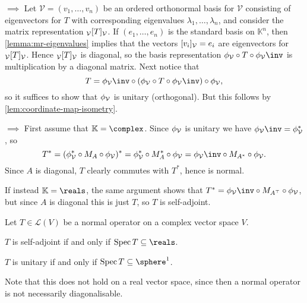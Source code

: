 \documentclass[a4paper, 11pt]{memoir}
\numberwithin{equation}{chapter}
\newcommand{\calL}{\mathcal{L}}
\newcommand{\calV}{\mathcal{V}}
\DeclareMathOperator{\spec}{Spec}
\newcommand{\trans}{^{\top}}
\begin{document}
\begin{proofof}
\begin{proofsec*}
    \item[\Namesubcref{enum:spectral-orthogonally-diagonalisable} $\implies$ \namesubcref{enum:spectral-multiplication-operator}]
    Let $\calV = (v_1, \ldots, v_n)$ be an ordered orthonormal basis for $\calV$ consisting of eigenvectors for $T$ with corresponding eigenvalues $\lambda_1, \ldots, \lambda_n$, and consider the matrix representation $\mr{\calV}{T}{\calV}$. If $(e_1, \ldots, e_n)$ is the standard basis on $\mathbb{K}^n$, then \cref{lemma:mr-eigenvalues} implies that the vectors $\coordvec{v_i}{\calV} = e_i$ are eigenvectors for $\mr{\calV}{T}{\calV}$. Hence $\mr{\calV}{T}{\calV}$ is diagonal, so the basis representation $\coordmap{\calV} \circ T \circ \coordmap{\calV}\inv$ is multiplication by a diagonal matrix. Next notice that
    \begin{equation*}
        T
            = \coordmap{\calV}\inv \circ (\coordmap{\calV} \circ T \circ \coordmap{\calV}\inv) \circ \coordmap{\calV},
    \end{equation*}
    so it suffices to show that $\coordmap{\calV}$ is unitary (orthogonal). But this follows by \cref{lem:coordinate-map-isometry}.

    \item[\Namesubcref{enum:spectral-multiplication-operator} $\implies$ \namesubcref{enum:spectral-selfadjoint-normal}]
    First assume that $\mathbb{K} = \complex$. Since $\coordmap{\calV}$ is unitary we have $\coordmap{\calV}\inv = \coordmap{\calV}^*$, so
    \begin{equation*}
        T^*
            = (\coordmap{\calV}^* \circ M_A \circ \coordmap{\calV})^*
            = \coordmap{\calV}^* \circ M_A^* \circ \coordmap{\calV}
            = \coordmap{\calV}\inv \circ M_{A^*} \circ \coordmap{\calV}.
    \end{equation*}
    Since $A$ is diagonal, $T$ clearly commutes with $T^*$, hence is normal.

    If instead $\mathbb{K} = \reals$, the same argument shows that $T^* = \coordmap{\calV}\inv \circ M_{A\trans} \circ \coordmap{\calV}$, but since $A$ is diagonal this is just $T$, so $T$ is self-adjoint.
\end{proofsec*}
\end{proofof}


\begin{corollary}
    \label{cor:self-adjoint-unitary-eigenvalue-characterisation}
    Let $T \in \calL(V)$ be a normal operator on a complex vector space $V$.
    \begin{enumcor}
        \item \label{enum:self-adjoint-eigenvalue-characterisation} $T$ is self-adjoint if and only if $\spec T \subseteq \reals$.
        \item \label{enum:unitary-eigenvalue-characterisation} $T$ is unitary if and only if $\spec T \subseteq \sphere^1$.
    \end{enumcor}
\end{corollary}
%
Note that this does not hold on a real vector space, since then a normal operator is not necessarily diagonalisable.
\end{document}
